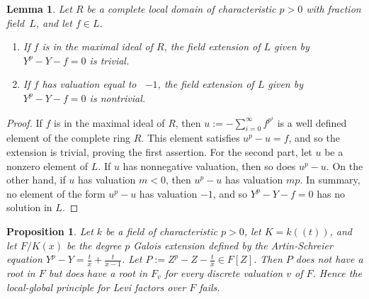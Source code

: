 \documentclass[12pt]{amsart}
\theoremstyle{plain}
\newtheorem{lemma}[thm]{Lemma}
\newtheorem{prop}[thm]{Proposition}
\theoremstyle{definition}
\theoremstyle{remark}
\begin{document}
\begin{lemma}
Let $R$ be a complete local domain of characteristic $p>0$ with fraction field~$L$, and let $f\in L$. 
\begin{enumerate}
\item[(a)]\label{trivial} If $f$ is in the maximal ideal of $R$, the field extension of $L$ given by $Y^p-Y-f=0$ is trivial. 
\item[(b)]\label{nontrivial} If $f$ has valuation equal to ~$-1$, the field extension of $L$ given by $Y^p-Y-f=0$ is nontrivial. 
\end{enumerate}
\end{lemma}
\begin{proof}
If $f$ is in the maximal ideal of $R$, then $u:=-\sum\limits_{i=0}^\infty f^{p^i}$ is a well defined element of the complete ring $R$. This element satisfies $u^p-u=f$, and so the extension is trivial, proving the first assertion. 
For the second part, let $u$ be a nonzero element of $L$. If $u$ has nonnegative valuation, then so does $u^p-u$. On the other hand, if $u$ has valuation $m<0$, then $u^p-u$ has valuation $mp$. In summary, no element of the form $u^p-u$ has valuation $-1$, and so $Y^p-Y-f=0$ has no solution in $L$.
\end{proof}


\begin{prop}\label{example}
Let $k$ be a field of characteristic $p>0$, let $K=k((t))$, and let $F/K(x)$ be the degree $p$ Galois extension defined by the Artin-Schreier equation $Y^p-Y=\frac{t}{x}+\frac{t}{x-1}$. Let $P:=Z^p-Z-\frac{t}{x}\in F[Z]$. Then $P$ does not have a root in $F$ but does have a root in $F_v$ for every discrete valuation $v$ of $F$. Hence the local-global principle for Levi factors over $F$ fails.
\end{prop}
\end{document}
